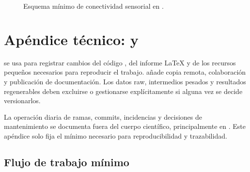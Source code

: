 \begin{figure}[H]
\centering
{}
\caption{Esquema mínimo de conectividad sensorial en \TikZ{}.}
\label{fig:tikz-connectivity}
\end{figure}

\section{Apéndice técnico: \Git{} y \GitHub{}}

\Git{} se usa para registrar cambios del código \Julia{}, del informe \LaTeX{} y de los recursos pequeños necesarios para reproducir el trabajo. \GitHub{} añade copia remota, colaboración y publicación de documentación. Los datos raw, intermedios pesados y resultados regenerables deben excluirse o gestionarse explícitamente si alguna vez se decide versionarlos.

\begin{pendiente}
\small
La operación diaria de ramas, commits, incidencias y decisiones de mantenimiento se documenta fuera del cuerpo científico, principalmente en . Este apéndice solo fija el mínimo necesario para reproducibilidad y trazabilidad.
\end{pendiente}

\subsection{Flujo de trabajo mínimo}

